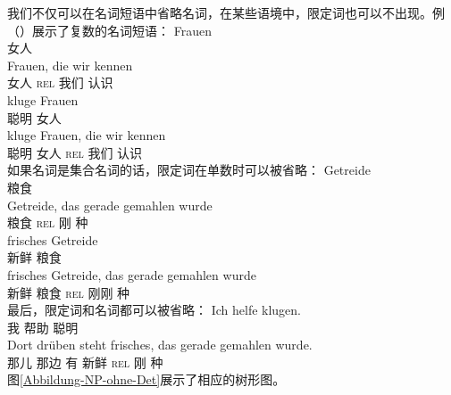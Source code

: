 我们不仅可以在名词短语中省略名词，在某些语境中，限定词也可以不出现。例（）展示了复数的名词短语：
\eal
\ex 
\gll Frauen\\
	 女人\\
\ex 
\gll Frauen, die wir kennen\\
	 女人 \textsc{rel} 我们 认识\\
\ex 
\gll kluge Frauen\\
	 聪明 女人\\
\ex 
\gll kluge Frauen, die wir kennen\\
	 聪明 女人 \textsc{rel} 我们 认识\\
\zl
如果名词是集合名词的话，限定词在单数时可以被省略：
\eal
\ex 
\gll Getreide\\
	 粮食\\
\ex 
\gll Getreide, das gerade gemahlen wurde\\
	 粮食 \textsc{rel} 刚 种 \passivepst{}\\
\ex 
\gll frisches Getreide\\
	 新鲜 粮食\\
\ex 
\gll frisches Getreide, das gerade gemahlen wurde\\
	 新鲜 粮食 \textsc{rel} 刚刚 种 \passivepst{}\\
\zl
最后，限定词和名词都可以被省略：
\eal
\ex 
\gll Ich helfe klugen.\\
	 我 帮助 聪明\\
\ex 
\gll Dort drüben steht frisches, das gerade gemahlen wurde.\\
	 那儿 那边 有 新鲜 \textsc{rel} 刚 种 \passivepst{}\\
\zl
图\vref{Abbildung-NP-ohne-Det}展示了相应的树形图。

